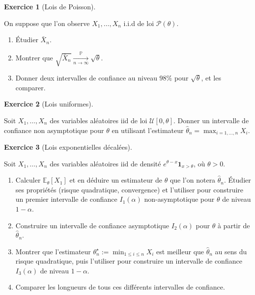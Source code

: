 \documentclass[
  10,
  letterpaper,
  DIV=11,
  numbers=noendperiod]{scrreport}
\providecommand{\tightlist}{%
  \setlength{\itemsep}{0pt}\setlength{\parskip}{0pt}}\usepackage{longtable,booktabs,array}
\theoremstyle{plain}
\theoremstyle{definition}
\newtheorem{exercise}{Exercice}[chapter]
\theoremstyle{plain}
\theoremstyle{definition}
\theoremstyle{definition}
\theoremstyle{plain}
\theoremstyle{remark}
\begin{document}

\begin{exercise}[Lois de
Poisson]\protect\hypertarget{exr-poisson}{}\label{exr-poisson}

On suppose que l'on observe \(X_1, \dots, X_n\) i.i.d de loi
\(\mathscr{P}(\theta)\).

\begin{enumerate}
\def\labelenumi{\arabic{enumi}.}
\tightlist
\item
  Étudier \(\bar{X}_n\).
\item
  Montrer que
  \(\sqrt{\bar{X}_n} \underset{n \rightarrow \infty}{\overset{\mathbb{P}}{\longrightarrow}} \sqrt{\theta}\).
\item
  Donner deux intervalles de confiance au niveau \(98 \%\) pour
  \(\sqrt{\theta}\), et les comparer.
\end{enumerate}

\end{exercise}

\begin{exercise}[Lois
uniformes]\protect\hypertarget{exr-unif}{}\label{exr-unif}

Soit \(X_1, \dotsc, X_n\) des variables aléatoires iid de loi
\(\mathscr{U}[0,\theta]\). Donner un intervalle de confiance non
asymptotique pour \(\theta\) en utilisant l'estimateur
\(\hat{\theta}_n = \max_{i=1,\dotsc, n}X_i\).

\end{exercise}

\begin{exercise}[Lois exponentielles
décalées]\protect\hypertarget{exr-expodec}{}\label{exr-expodec}

Soit \(X_1, \dotsc, X_n\) des variables aléatoires iid de densité
\(e^{\theta-x} \mathbf{1}_{x>\theta}\), où \(\theta >0\).

\begin{enumerate}
\def\labelenumi{\arabic{enumi}.}
\tightlist
\item
  Calculer \(\mathbb{E}_\theta\left[X_1\right]\) et en déduire un
  estimateur de \(\theta\) que l'on notera \(\hat\theta_n\). Étudier ses
  propriétés (risque quadratique, convergence) et l'utiliser pour
  construire un premier intervalle de confiance \(I_1(\alpha)\)
  non-asymptotique pour \(\theta\) de niveau \(1-\alpha\).
\item
  Construire un intervalle de confiance asymptotique \(I_2(\alpha)\)
  pour \(\theta\) à partir de \(\hat{\theta}_n\).
\item
  Montrer que l'estimateur
  \(\theta_n^\star := \min_{1 \leq i \leq n} X_i\) est meilleur que
  \(\hat \theta_n\) au sens du risque quadratique, puis l'utiliser pour
  construire un intervalle de confiance \(I_3(\alpha)\) de niveau
  \(1-\alpha\).
\item
  Comparer les longueurs de tous ces différents intervalles de
  confiance.
\end{enumerate}

\end{exercise}
\end{document}
